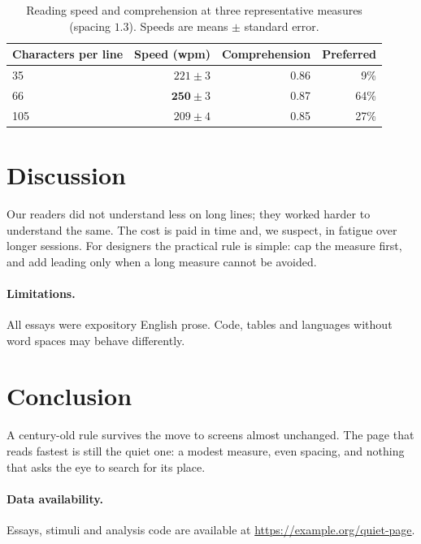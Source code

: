 \documentclass[11pt]{article}
\begin{document}
\begin{table}[t]
  \centering
  \caption{Reading speed and comprehension at three representative measures
    (spacing $1.3$). Speeds are means $\pm$ standard error.}
  \label{tab:results}
  \begin{tabular}{@{}l r r r@{}}
    \toprule
    Characters per line & Speed (wpm)              & Comprehension & Preferred \\
    \midrule
    35                  & $221 \pm 3$              & 0.86          & 9\%       \\
    66                  & $\mathbf{250} \pm 3$     & 0.87          & 64\%      \\
    105                 & $209 \pm 4$              & 0.85          & 27\%      \\
    \bottomrule
  \end{tabular}
\end{table}

\section{Discussion}

Our readers did not understand less on long lines; they worked harder to
understand the same. The cost is paid in time and, we suspect, in fatigue over
longer sessions. For designers the practical rule is simple: cap the measure
first, and add leading only when a long measure cannot be avoided.

\paragraph{Limitations.} All essays were expository English prose. Code,
tables and languages without word spaces may behave differently.

\section{Conclusion}

A century-old rule survives the move to screens almost unchanged. The page that
reads fastest is still the quiet one: a modest measure, even spacing, and
nothing that asks the eye to search for its place.

\paragraph{Data availability.} Essays, stimuli and analysis code are available at
\url{https://example.org/quiet-page}.

\printbibliography
\end{document}
